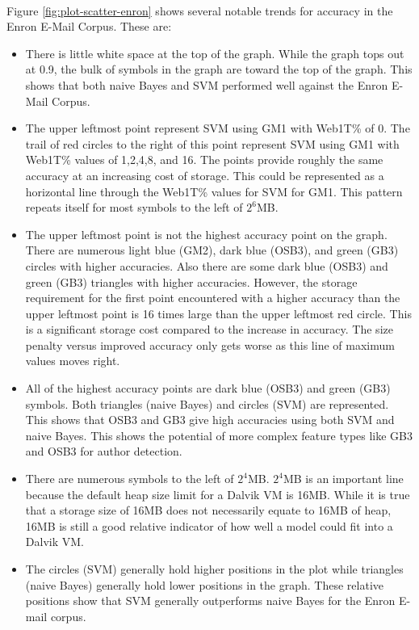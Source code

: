 \paragraph*{} Figure \ref{fig:plot-scatter-enron} shows several notable trends for accuracy in the Enron E-Mail Corpus.  These are:
	\begin{itemize}
		\item There is little white space at the top of the graph.  While the graph tops out at 0.9, the bulk of symbols in the graph are toward the top of the graph.  This shows that both naive Bayes and SVM performed well against the Enron E-Mail Corpus.
		\item The upper leftmost point represent SVM using GM1 with Web1T\% of 0.  The trail of red circles to the right of this point represent SVM using GM1 with Web1T\% values of 1,2,4,8, and 16.  The points provide roughly the same accuracy at an increasing cost of storage.  This could be represented as a horizontal line through the Web1T\% values for SVM for GM1.  This pattern repeats itself for most symbols to the left of $2^6$MB.
		\item The upper leftmost point is not the highest accuracy point on the graph.  There are numerous light blue (GM2), dark blue (OSB3), and green (GB3) circles with higher accuracies.  Also there are some dark blue (OSB3) and green (GB3) triangles with higher accuracies.  However, the storage requirement for the first point encountered with a higher accuracy than the upper leftmost point is 16 times large than the upper leftmost red circle.  This is a significant storage cost compared to the increase in accuracy.  The size penalty versus improved accuracy only gets worse as this line of maximum values moves right.
		\item All of the highest accuracy points are dark blue (OSB3) and green (GB3) symbols.  Both triangles (naive Bayes) and circles (SVM) are represented.  This shows that OSB3 and GB3 give high accuracies using both SVM and naive Bayes.  This shows the potential of more complex feature types like GB3 and OSB3 for author detection.
		\item There are numerous symbols to the left of $2^4$MB.  $2^4$MB is an important line because the default heap size limit for a Dalvik VM is 16MB.  While it is true that a storage size of 16MB does not necessarily equate to 16MB of heap, 16MB is still a good relative indicator of how well a model could fit into a Dalvik VM.
		\item The circles (SVM) generally hold higher positions in the plot while triangles (naive Bayes) generally hold lower positions in the graph. These relative positions show that SVM generally outperforms naive Bayes for the Enron E-mail corpus.

\end{itemize}
